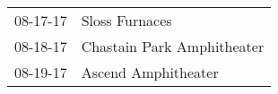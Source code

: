 \begin{supertabular}{p{0.25\columnwidth}p{0.75\columnwidth}}
 08-17-17 &              Sloss Furnaces \\
 08-18-17 &  Chastain Park Amphitheater \\
 08-19-17 &         Ascend Amphitheater \\
\end{supertabular}
